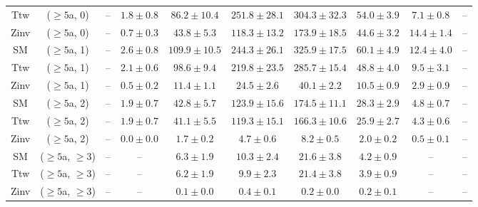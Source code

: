 \begin{table}[h!]
{\begin{tabular}{cccccccccc}
	Ttw & ($\ge5$a, 0) & -- & $1.8\pm 0.8$ & $86.2\pm 10.4$ & $251.8\pm 28.1$ & $304.3\pm 32.3$ & $54.0\pm 3.9$ & $7.1\pm 0.8$ & -- \\[0.5ex] 
	Zinv & ($\ge5$a, 0) & -- & $0.7\pm 0.3$ & $43.8\pm 5.3$ & $118.3\pm 13.2$ & $173.9\pm 18.5$ & $44.6\pm 3.2$ & $14.4\pm 1.4$ & -- \\[0.5ex] 
	SM & ($\ge5$a, 1) & -- & $2.6\pm 0.8$ & $109.9\pm 10.5$ & $244.3\pm 26.1$ & $325.9\pm 17.5$ & $60.1\pm 4.9$ & $12.4\pm 4.0$ & -- \\[0.5ex] 
	Ttw & ($\ge5$a, 1) & -- & $2.1\pm 0.6$ & $98.6\pm 9.4$ & $219.8\pm 23.5$ & $285.7\pm 15.4$ & $48.8\pm 4.0$ & $9.5\pm 3.1$ & -- \\[0.5ex] 
	Zinv & ($\ge5$a, 1) & -- & $0.5\pm 0.2$ & $11.4\pm 1.1$ & $24.5\pm 2.6$ & $40.1\pm 2.2$ & $10.5\pm 0.9$ & $2.9\pm 0.9$ & -- \\[0.5ex] 
	SM & ($\ge5$a, 2) & -- & $1.9\pm 0.7$ & $42.8\pm 5.7$ & $123.9\pm 15.6$ & $174.5\pm 11.1$ & $28.3\pm 2.9$ & $4.8\pm 0.7$ & -- \\[0.5ex] 
	Ttw & ($\ge5$a, 2) & -- & $1.9\pm 0.7$ & $41.1\pm 5.5$ & $119.3\pm 15.1$ & $166.3\pm 10.6$ & $25.9\pm 2.7$ & $4.3\pm 0.6$ & -- \\[0.5ex] 
	Zinv & ($\ge5$a, 2) & -- & $0.0\pm 0.0$ & $1.7\pm 0.2$ & $4.7\pm 0.6$ & $8.2\pm 0.5$ & $2.0\pm 0.2$ & $0.5\pm 0.1$ & -- \\[0.5ex] 
	SM & ($\ge5$a, $\ge3$) & -- & -- & $6.3\pm 1.9$ & $10.3\pm 2.4$ & $21.6\pm 3.8$ & $4.2\pm 0.9$ & -- & -- \\[0.5ex] 
	Ttw & ($\ge5$a, $\ge3$) & -- & -- & $6.2\pm 1.9$ & $9.9\pm 2.3$ & $21.4\pm 3.8$ & $3.9\pm 0.9$ & -- & -- \\[0.5ex] 
	Zinv & ($\ge5$a, $\ge3$) & -- & -- & $0.1\pm 0.0$ & $0.4\pm 0.1$ & $0.2\pm 0.0$ & $0.2\pm 0.1$ & -- & -- \\[0.5ex] 
	\hline
	\hline
\end{tabular}}
\end{table}
